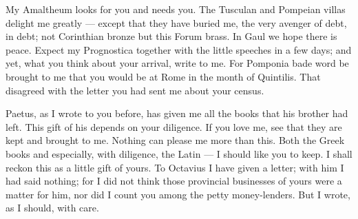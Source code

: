  My Amaltheum looks for you and needs you. The Tusculan and Pompeian villas delight me greatly --- except that they have buried me, the very avenger of debt, in debt; not Corinthian bronze but this Forum brass. In Gaul we hope there is peace. Expect my Prognostica together with the little speeches in a few days; and yet, what you think about your arrival, write to me. For Pomponia bade word be brought to me that you would be at Rome in the month of Quintilis. That disagreed with the letter you had sent me about your census.

 Paetus, as I wrote to you before, has given me all the books that his brother had left. This gift of his depends on your diligence. If you love me, see that they are kept and brought to me. Nothing can please me more than this. Both the Greek books and especially, with diligence, the Latin --- I should like you to keep. I shall reckon this as a little gift of yours. To Octavius I have given a letter; with him I had said nothing; for I did not think those provincial businesses of yours were a matter for him, nor did I count you among the petty money-lenders. But I wrote, as I should, with care.
